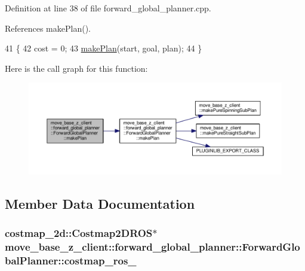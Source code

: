 Definition at line 38 of file forward\+\_\+global\+\_\+planner.\+cpp.



References make\+Plan().


\begin{DoxyCode}
41 \{
42     cost = 0;
43     \hyperlink{classmove__base__z__client_1_1forward__global__planner_1_1ForwardGlobalPlanner_a2dcf9aad74efaaa92ee78650f7a23096}{makePlan}(start, goal, plan);
44 \}
\end{DoxyCode}


Here is the call graph for this function\+:\nopagebreak
\begin{figure}[H]
\begin{center}
\leavevmode
\includegraphics[width=350pt]{classmove__base__z__client_1_1forward__global__planner_1_1ForwardGlobalPlanner_a16f21fc4735c26535517678d29a6f1f3_cgraph}
\end{center}
\end{figure}




\subsection{Member Data Documentation}
\subsubsection[{\texorpdfstring{costmap\+\_\+ros\+\_\+}{costmap_ros_}}]{\setlength{\rightskip}{0pt plus 5cm}costmap\+\_\+2d\+::\+Costmap2\+D\+R\+OS$\ast$ move\+\_\+base\+\_\+z\+\_\+client\+::forward\+\_\+global\+\_\+planner\+::\+Forward\+Global\+Planner\+::costmap\+\_\+ros\+\_\+\hspace{0.3cm}{\ttfamily [private]}}\hypertarget{classmove__base__z__client_1_1forward__global__planner_1_1ForwardGlobalPlanner_aba11d85f5f4c9370873195ca97497a22}{}\label{classmove__base__z__client_1_1forward__global__planner_1_1ForwardGlobalPlanner_aba11d85f5f4c9370873195ca97497a22}


